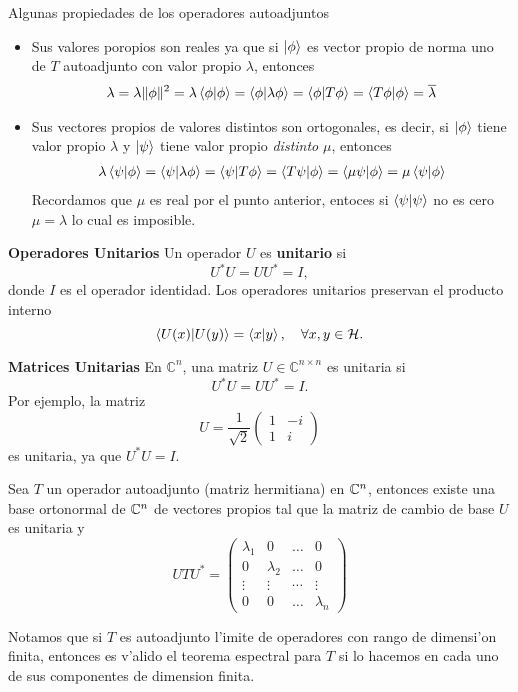 \documentclass[main.tex]{subfiles}
\begin{document}
Algunas propiedades de los operadores autoadjuntos
\begin{itemize}
  \item Sus valores poropios son reales ya que si \(\ket{\phi}\) es vector propio de norma uno de $T$ autoadjunto con valor propio \(\lambda\), entonces
        \begin{align*}
        \lambda=\lambda\|\phi\|^{2}=\lambda\braket{\phi|\phi}=\braket{\phi|\lambda\phi}=\braket{\phi|T\phi}=\braket{T\phi|\phi}=\overline{\lambda}
        \end{align*}
  \item Sus vectores propios de valores distintos son ortogonales, es decir, si $\ket{\phi}$ tiene valor propio $\lambda$ y $\ket{\psi}$ tiene valor propio \emph{distinto} $\mu$, entonces
        \begin{align*}
        \lambda\braket{\psi|\phi}=\braket{\psi|\lambda\phi}=\braket{\psi|T\phi}=\braket{T\psi|\phi}=\braket{\mu\psi|\phi}=\mu\braket{\psi|\phi}
        \end{align*}
        Recordamos que $\mu$ es real por el punto anterior, entoces si $\braket{\psi|\psi}$ no es cero $\mu=\lambda$ lo cual es imposible.

\end{itemize}
\eje\textbf{Operadores Unitarios}
Un operador $U$ es \textbf{unitario} si
\[
U^* U = U U^* = I,
\]
donde $I$ es el operador identidad. Los operadores unitarios preservan el producto interno
\[
\braket{ U(x)| U(y)} = \braket{ x | y}, \quad \forall x, y \in \mathcal{H}.
\]

\eje\textbf{Matrices Unitarias}
En $\mathbb{C}^n$, una matriz $U \in \mathbb{C}^{n \times n}$ es unitaria si
\[
U^* U = U U^* = I.
\]
Por ejemplo, la matriz
\[
U = \frac{1}{\sqrt{2}} \begin{pmatrix}
1 & -i \\
1 & i
\end{pmatrix}
\]
es unitaria, ya que $U^* U = I$.
\begin{teorema}
Sea \(T\) un operador autoadjunto (matriz hermitiana) en $\mathbb{C}^n$, entonces existe una base ortonormal de \(\mathbb{C}^n\) de vectores propios tal que la matriz de cambio de base \(U\) es unitaria y
\[
UTU^{*}= \begin{pmatrix}\lambda_{1}& 0 & \dots & 0\\ 0 & \lambda_{2} & \dots & 0\\ \vdots & \vdots & \cdots & \vdots\\ 0 & 0 & \dots & \lambda_{n} \end{pmatrix}
\]
\end{teorema}
\obs Notamos que si $T$ es autoadjunto l'imite de operadores con rango de dimensi'on finita, entonces es v'alido  el teorema espectral para $T$ si lo hacemos en cada uno de sus componentes de dimension finita.
\end{document}
